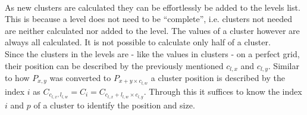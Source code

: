 \documentclass[10pt,a4paper,titlepage]{article}
\begin{document}
\begin{figure}
		\begin{minipage}{.4\textwidth}
			\centering
		\end{minipage}
	\end{figure}
	\\As new clusters are calculated they can be effortlessly be added to the levels list. This is because a level does not need to be ``complete'', i.e. clusters not needed are neither calculated nor added to the level. The values of a cluster however are always all calculated. It is not possible to calculate only half of a cluster.\\
	Since the clusters in the levels are - like the values in clusters - on a perfect grid, their position can be described by the previously mentioned \(c_{l,x}\) and \(c_{l,y}\). Similar to how \(P_{x,y}\) was converted to \(P_{x + y \times c_{l,w}}\) a cluster position is described by the index \(i\) as \(C_{c_{l,x}, l_{l,w}} = C_{i} = C_{c_{l,x} + l_{l,w} \times c_{l,y}}\). Through this it suffices to know the index \(i\) and \(p\) of a cluster to identify the position and size.\\
\end{document}
